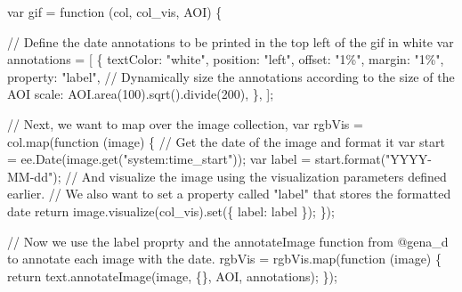 \documentclass[
  letterpaper,
  DIV=11,
  numbers=noendperiod]{scrreprt}
\newenvironment{Shaded}{\begin{snugshade}}{\end{snugshade}}
\newcommand{\CommentTok}[1]{\textcolor[rgb]{0.37,0.37,0.37}{#1}}
\newcommand{\ControlFlowTok}[1]{\textcolor[rgb]{0.00,0.23,0.31}{#1}}
\newcommand{\DataTypeTok}[1]{\textcolor[rgb]{0.68,0.00,0.00}{#1}}
\newcommand{\DecValTok}[1]{\textcolor[rgb]{0.68,0.00,0.00}{#1}}
\newcommand{\FunctionTok}[1]{\textcolor[rgb]{0.28,0.35,0.67}{#1}}
\newcommand{\KeywordTok}[1]{\textcolor[rgb]{0.00,0.23,0.31}{#1}}
\newcommand{\NormalTok}[1]{\textcolor[rgb]{0.00,0.23,0.31}{#1}}
\newcommand{\OperatorTok}[1]{\textcolor[rgb]{0.37,0.37,0.37}{#1}}
\newcommand{\StringTok}[1]{\textcolor[rgb]{0.13,0.47,0.30}{#1}}
\begin{document}
\begin{Shaded}
\begin{Highlighting}[]
\KeywordTok{var}\NormalTok{ gif }\OperatorTok{=} \KeywordTok{function}\NormalTok{ (col}\OperatorTok{,}\NormalTok{ col\_vis}\OperatorTok{,}\NormalTok{ AOI) \{}

    \CommentTok{// Define the date annotations to be printed in the top left of the gif in white}
  \KeywordTok{var}\NormalTok{ annotations }\OperatorTok{=}\NormalTok{ [}
\NormalTok{    \{}
      \DataTypeTok{textColor}\OperatorTok{:} \StringTok{"white"}\OperatorTok{,}
      \DataTypeTok{position}\OperatorTok{:} \StringTok{"left"}\OperatorTok{,}
      \DataTypeTok{offset}\OperatorTok{:} \StringTok{"1\%"}\OperatorTok{,}
      \DataTypeTok{margin}\OperatorTok{:} \StringTok{"1\%"}\OperatorTok{,}
      \DataTypeTok{property}\OperatorTok{:} \StringTok{"label"}\OperatorTok{,}
      \CommentTok{// Dynamically size the annotations according to the size of the AOI}
      \DataTypeTok{scale}\OperatorTok{:}\NormalTok{ AOI}\OperatorTok{.}\FunctionTok{area}\NormalTok{(}\DecValTok{100}\NormalTok{)}\OperatorTok{.}\FunctionTok{sqrt}\NormalTok{()}\OperatorTok{.}\FunctionTok{divide}\NormalTok{(}\DecValTok{200}\NormalTok{)}\OperatorTok{,}
\NormalTok{    \}}\OperatorTok{,}
\NormalTok{  ]}\OperatorTok{;}

    \CommentTok{// Next, we want to map over the image collection,}
    \KeywordTok{var}\NormalTok{ rgbVis }\OperatorTok{=}\NormalTok{ col}\OperatorTok{.}\FunctionTok{map}\NormalTok{(}\KeywordTok{function}\NormalTok{ (image) \{}
        \CommentTok{// Get the date of the image and format it}
        \KeywordTok{var}\NormalTok{ start }\OperatorTok{=}\NormalTok{ ee}\OperatorTok{.}\FunctionTok{Date}\NormalTok{(image}\OperatorTok{.}\FunctionTok{get}\NormalTok{(}\StringTok{"system:time\_start"}\NormalTok{))}\OperatorTok{;}
        \KeywordTok{var}\NormalTok{ label }\OperatorTok{=}\NormalTok{ start}\OperatorTok{.}\FunctionTok{format}\NormalTok{(}\StringTok{"YYYY{-}MM{-}dd"}\NormalTok{)}\OperatorTok{;}
        \CommentTok{// And visualize the image using the visualization parameters defined earlier.}
        \CommentTok{// We also want to set a property called "label" that stores the formatted date }
        \ControlFlowTok{return}\NormalTok{ image}\OperatorTok{.}\FunctionTok{visualize}\NormalTok{(col\_vis)}\OperatorTok{.}\FunctionTok{set}\NormalTok{(\{ }\DataTypeTok{label}\OperatorTok{:}\NormalTok{ label \})}\OperatorTok{;}
\NormalTok{  \})}\OperatorTok{;}

    \CommentTok{// Now we use the label proprty and the annotateImage function from @gena\_d to annotate each image with the date. }
\NormalTok{  rgbVis }\OperatorTok{=}\NormalTok{ rgbVis}\OperatorTok{.}\FunctionTok{map}\NormalTok{(}\KeywordTok{function}\NormalTok{ (image) \{}
    \ControlFlowTok{return}\NormalTok{ text}\OperatorTok{.}\FunctionTok{annotateImage}\NormalTok{(image}\OperatorTok{,}\NormalTok{ \{\}}\OperatorTok{,}\NormalTok{ AOI}\OperatorTok{,}\NormalTok{ annotations)}\OperatorTok{;}
\NormalTok{  \})}\OperatorTok{;}


\end{Highlighting}
\end{Shaded}
\end{document}
